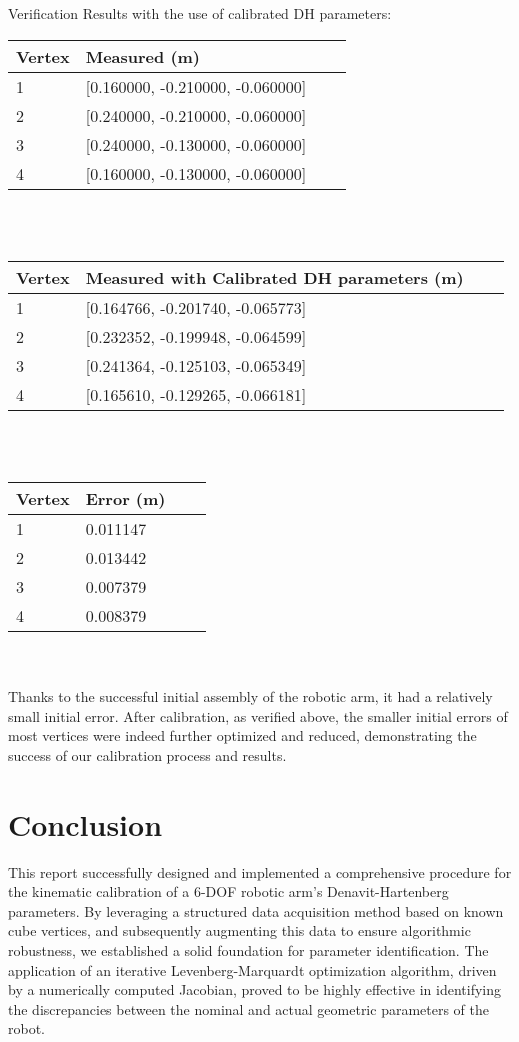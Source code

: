 \documentclass[conference]{IEEEtran}
\begin{document}
Verification Results with the use of calibrated DH parameters:\\
\begin{tabular}{llll}
\toprule
Vertex & Measured (m)\\
\midrule
1 & [0.160000, -0.210000, -0.060000]\\
2 & [0.240000, -0.210000, -0.060000]\\
3 & [0.240000, -0.130000, -0.060000]\\
4 & [0.160000, -0.130000, -0.060000]\\
\bottomrule
\end{tabular}
\\\\

\begin{tabular}{llll}
\toprule
Vertex & Measured with Calibrated DH parameters (m) \\
\midrule
1 & [0.164766, -0.201740, -0.065773]\\
2 & [0.232352, -0.199948, -0.064599]\\
3 & [0.241364, -0.125103, -0.065349]\\
4 & [0.165610, -0.129265, -0.066181]\\
\bottomrule
\end{tabular}
\\\\

\begin{tabular}{llll}
\toprule
Vertex & Error (m) \\
\midrule
1 & 0.011147 \\
2 & 0.013442 \\
3 & 0.007379 \\
4 & 0.008379 \\
\bottomrule
\end{tabular}
\\\\

\indent Thanks to the successful initial assembly of the robotic arm, it had a relatively small initial error. After calibration, as verified above, the smaller initial errors of most vertices were indeed further optimized and reduced, demonstrating the success of our calibration process and results.


\section{Conclusion}
This report successfully designed and implemented a comprehensive procedure for the kinematic calibration of a 6-DOF robotic arm's Denavit-Hartenberg parameters. By leveraging a structured data acquisition method based on known cube vertices, and subsequently augmenting this data to ensure algorithmic robustness, we established a solid foundation for parameter identification. The application of an iterative Levenberg-Marquardt optimization algorithm, driven by a numerically computed Jacobian, proved to be highly effective in identifying the discrepancies between the nominal and actual geometric parameters of the robot.
\end{document}
